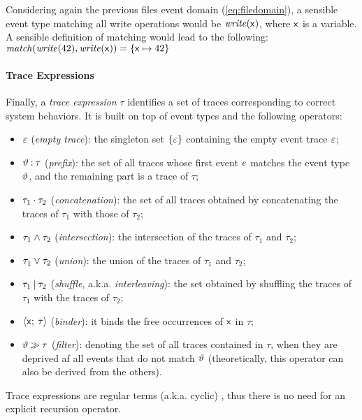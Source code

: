 Considering again the previous files event domain (\ref{eq:filedomain}), a sensible event type matching all write operations would be \(\mathit{write}(\mathsf{x})\), where \(\mathsf{x}\) is a variable.
A sensible definition of matching would lead to the following: $\mathit{match}(\mathit{write}(42), \mathit{write}(\mathsf{x})) = \{ \mathsf{x} \mapsto 42 \}$


\paragraph{Trace Expressions}
Finally, a \emph{trace expression} \(\tau\) identifies a set of traces corresponding to correct system behaviors. It is built on top of event types and the following operators:
\begin{itemize}
	\item $\varepsilon$ (\emph{empty trace}): the singleton set $\{\varepsilon\}$ containing  the empty event trace $\varepsilon$;
	\item $\vartheta\mathbin{:}\tau$ (\emph{prefix}): the set of all traces whose first event $e$ matches the event type $\vartheta$, and the remaining part is a trace of $\tau$;
	\item $\tau_1\mathbin{\cdot}\tau_2$ (\emph{concatenation}): the set of all traces obtained by concatenating the traces of $\tau_1$ with those of $\tau_2$; 
	\item $\tau_1\mathbin{\wedge} \tau_2$ (\emph{intersection}): the intersection of the traces of $\tau_1$ and $\tau_2$;
	\item $\tau_1\mathbin{\vee} \tau_2$ (\emph{union}): the union of the traces of $\tau_1$ and $\tau_2$; 
	\item $\tau_1\mathbin{|} \tau_2$ (\emph{shuffle}, a.k.a. \emph{interleaving}): the set obtained by shuffling the traces of $\tau_1$ with the traces of $\tau_2$;
	\item ${\langle}\mathsf{x};\:{\tau}{\rangle}$ (\emph{binder}): it binds the free occurrences of $\mathsf{x}$ in $\tau$;
	\item $\vartheta\mathbin{\gg}\tau$ (\emph{filter}):
	denoting the set of all traces contained in $\tau$, when they are deprived af all events that do not match $\vartheta$ (theoretically, this operator can also be derived from the others).
\end{itemize}

Trace expressions are regular terms (a.k.a. cyclic) \cite{Courcelle83}, thus there is no need for an explicit recursion operator.


